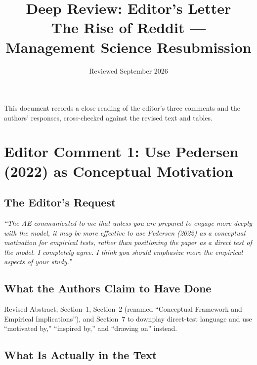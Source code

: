 \documentclass[11pt]{article}
\title{\textbf{Deep Review: Editor's Letter}\\
\large The Rise of Reddit --- Management Science Resubmission}
\date{Reviewed September 2026}
\begin{document}
\maketitle

This document records a close reading of the editor's three comments and
the authors' responses, cross-checked against the revised text and tables.

\tableofcontents
\newpage

\section{Editor Comment 1: Use Pedersen (2022) as Conceptual Motivation}

\subsection*{The Editor's Request}
\begin{mdframed}
\textit{``The AE communicated to me that unless you are prepared to engage
more deeply with the model, it may be more effective to use Pedersen (2022)
as a conceptual motivation for empirical tests, rather than positioning the
paper as a direct test of the model. I completely agree. I think you should
emphasize more the empirical aspects of your study.''}
\end{mdframed}

\subsection*{What the Authors Claim to Have Done}
Revised Abstract, Section~1, Section~2 (renamed ``Conceptual Framework and
Empirical Implications''), and Section~7 to downplay direct-test language
and use ``motivated by,'' ``inspired by,'' and ``drawing on'' instead.

\subsection*{What Is Actually in the Text}
\end{document}
